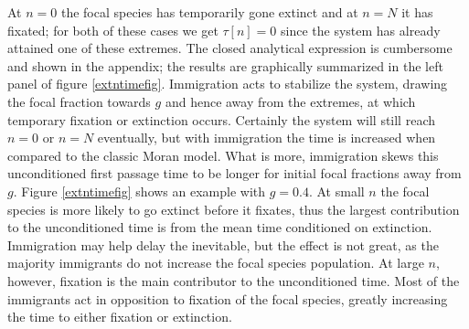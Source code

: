 At $n=0$ the focal species has temporarily gone extinct and at $n=N$ it has fixated; for both of these cases we get $\tau[n]=0$ since the system has already attained one of these extremes. %
The closed analytical expression is cumbersome and shown in the appendix; the results are graphically summarized in the left panel of figure \ref{extntimefig}. %
Immigration acts to stabilize the system, drawing the focal fraction towards $g$ and hence away from the extremes, at which temporary fixation or extinction occurs. 
Certainly the system will still reach $n=0$ or $n=N$ eventually, but with immigration the time is increased when compared to the classic Moran model. 
What is more, immigration skews this unconditioned first passage time to be longer for initial focal fractions away from $g$. 
Figure \ref{extntimefig} shows an example with $g=0.4$. 
At small $n$ the focal species is more likely to go extinct before it fixates, thus the largest contribution to the unconditioned time is from the mean time conditioned on extinction. Immigration may help delay the inevitable, but the effect is not great, as the majority immigrants do not increase the focal species population. %
At large $n$, however, fixation is the main contributor to the unconditioned time. 
Most of the immigrants act in opposition to fixation of the focal species, greatly increasing the time to either fixation or extinction. 
